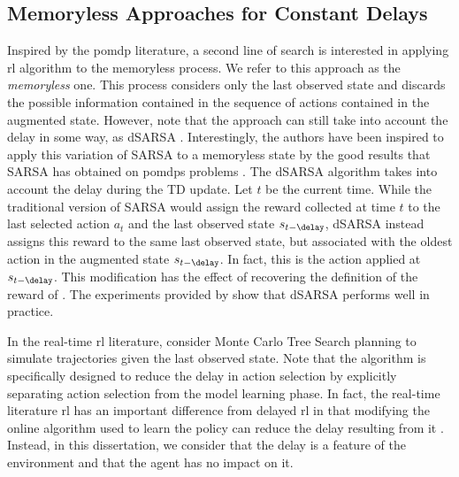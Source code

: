 \subsection{Memoryless Approaches for Constant Delays}
\label{subsec:memoryless}
Inspired by the \gls{pomdp} literature, a second line of search is interested in applying \gls{rl} algorithm to the memoryless process. We refer to this approach as the \emph{memoryless} one.
This process considers only the last observed state and discards the possible information contained in the sequence of actions contained in the augmented state. 
However, note that the approach can still take into account the delay in some way, as dSARSA \cite{schuitema2010control}. 
Interestingly, the authors have been inspired to apply this variation of SARSA \cite{rummery1994line} to a memoryless state by the good results that SARSA has obtained on \glspl{pomdp} problems \cite{loch1998using}. 
The dSARSA algorithm takes into account the delay during the TD update. Let $t$ be the current time.
While the traditional version of SARSA would assign the reward collected at time $t$ to the last selected action $a_t$ and the last observed state $s_{t-\delay}$, dSARSA instead assigns this reward to the same last observed state, but associated with the oldest action in the augmented state $s_{t-\delay}$. 
In fact, this is the action applied at $s_{t-\delay}$. 
This modification has the effect of recovering the definition of the reward of .
The experiments provided by \cite{schuitema2010control} show that 
dSARSA performs well in practice.

In the real-time \gls{rl} literature, \cite{hester2013texplore} consider Monte Carlo Tree Search planning to simulate trajectories given the last observed state. 
Note that the algorithm is specifically designed to reduce the delay in action selection by explicitly separating action selection from the model learning phase.
In fact, the real-time literature \gls{rl} has an important difference from delayed \gls{rl} in that modifying the online algorithm used to learn the policy can reduce the delay resulting from it \cite{hester2012rtmba,caarls2015parallel,ramstedt2019real}. 
Instead, in this dissertation, we consider that the delay is a feature of the environment and that the agent has no impact on it. 

